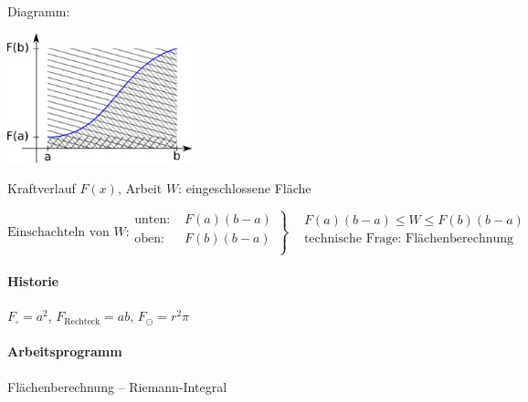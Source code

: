 \noindent Diagramm:
\begin{center}
	\includegraphics[width=0.4\textwidth]{include/20100126-2.pdf}
\end{center}
Kraftverlauf $F(x)$, Arbeit $W$: eingeschlossene Fläche

\begin{equation*}
	\text{Einschachteln von $W$:}\left.
	\begin{aligned}
		\text{unten: } & F(a) (b - a) \\
		\text{oben: } & F(b) (b - a) \\
	\end{aligned}
	\right\}
	\begin{aligned}
		& F(a) (b - a) \leq W \leq F(b) (b - a) \\
		& \text{technische Frage: Flächenberechnung} \\
	\end{aligned}
\end{equation*}

\paragraph{Historie} $F_\square = a^2$, $F_{\text{Rechteck}} = ab$, $F_\bigcirc = r^2\pi$

\paragraph{Arbeitsprogramm} Flächenberechnung -- Riemann-Integral

